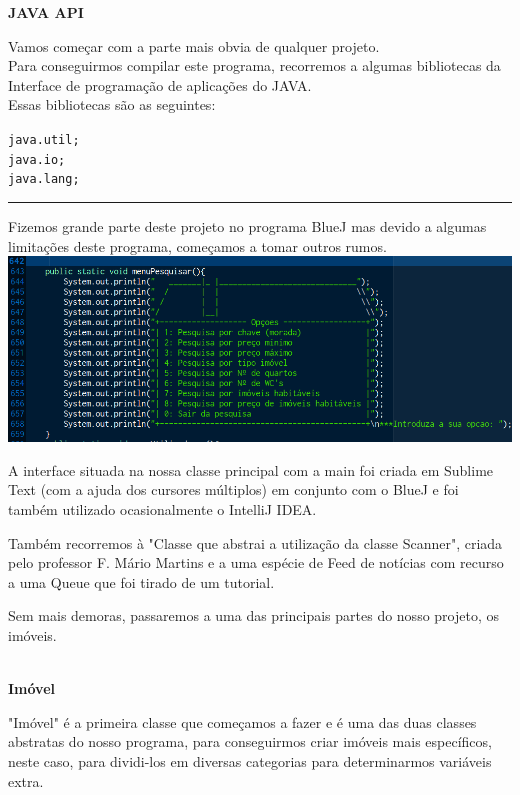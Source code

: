 \documentclass[12pt]{article}
\newenvironment{code}                    
{\textbf{
} \hspace{1cm} \hrulefill \\ 
\smallskip 
\begin{center}
\begin{minipage}{0.9\textwidth} 
\begin{alltt}\small}
{\end{alltt}
\end{minipage}
\end{center}
\hrule\smallskip
}
\begin{document}
\textbf{JAVA API}
\newline

Vamos começar com a parte mais obvia de qualquer projeto.\\
Para conseguirmos compilar este programa, recorremos a algumas bibliotecas da Interface de programação de aplicações do JAVA.\\

Essas bibliotecas são as seguintes:
\newline
\begin{code}
java.util;
java.io;
java.lang;
\end{code}

Fizemos grande parte deste projeto no programa BlueJ mas devido a algumas limitações deste programa, começamos a tomar outros rumos.
\newline
\newline
\includegraphics[scale=0.4]{002.png}	 
\newline
\newline

A interface situada na nossa classe principal com a main foi criada em Sublime Text (com a ajuda dos cursores múltiplos) em conjunto com o BlueJ e foi também utilizado ocasionalmente o IntelliJ IDEA.
\newline

Também recorremos à "Classe que abstrai a utilização da classe Scanner", criada pelo professor F. Mário Martins e a uma espécie de Feed de notícias com recurso a uma Queue que foi tirado de um tutorial.
\newline
\newline

Sem mais demoras, passaremos a uma das principais partes do nosso projeto, os imóveis.

\pagebreak

\textbf{\\Imóvel}
\newline

"Imóvel" é a primeira classe que começamos a fazer e é uma das duas classes abstratas do nosso programa, para conseguirmos criar imóveis mais específicos, neste caso, para dividi-los em diversas categorias para determinarmos variáveis extra. 
\newline
\end{document}
